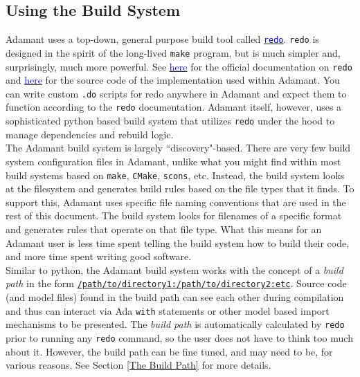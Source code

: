 \subsection{Using the Build System} \label{Using the Build System}

Adamant uses a top-down, general purpose build tool called \href{https://redo.readthedocs.io/en/latest/}{\texttt{\textcolor{blue}{redo}}}. \texttt{redo} is designed in the spirit of the long-lived \texttt{make} program, but is much simpler and, surprisingly, much more powerful. See \href{https://redo.readthedocs.io/en/latest/}{{\textcolor{blue}{here}}} for the official documentation on \texttt{redo} and \href{https://github.com/dinkelk/redo}{{\textcolor{blue}{here}}} for the source code of the implementation used within Adamant. You can write custom \texttt{.do} scripts for redo anywhere in Adamant and expect them to function according to the \texttt{redo} documentation. Adamant itself, however, uses a sophisticated python based build system that utilizes \texttt{redo} under the hood to manage dependencies and rebuild logic. \\

The Adamant build system is largely ``discovery"-based. There are very few build system configuration files in Adamant, unlike what you might find within most build systems based on \texttt{make}, \texttt{CMake}, \texttt{scons}, etc. Instead, the build system looks at the filesystem and generates build rules based on the file types that it finds. To support this, Adamant uses specific file naming conventions that are used in the rest of this document. The build system looks for filenames of a specific format and generates rules that operate on that file type. What this means for an Adamant user is less time spent telling the build system how to build their code, and more time spent writing good software. \\

Similar to python, the Adamant build system works with the concept of a \textit{build path} in the form \texttt{\url{/path/to/directory1:/path/to/directory2:etc}}. Source code (and model files) found in the build path can see each other during compilation and thus can interact via Ada \texttt{with} statements or other model based import mechanisms to be presented. The \textit{build path} is automatically calculated by \texttt{redo} prior to running any \texttt{redo} command, so the user does not have to think too much about it. However, the build path can be fine tuned, and may need to be, for various reasons. See Section \ref{The Build Path} for more details. \\

